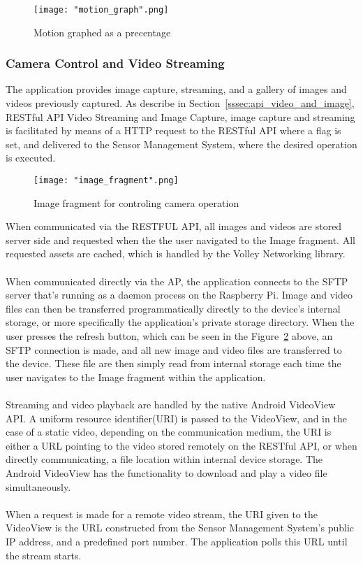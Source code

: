 \documentclass{article}
\begin{document}
\begin{figure}[H]
\centering
\texttt{[image: "motion\_graph".png]}
\caption{Motion graphed as a precentage}
\label{fig:android_summary_motion}
\end{figure}

\subsubsection{Camera Control and Video Streaming}
The application provides image capture, streaming, and a gallery of images and videos previously captured. As describe in Section~\ref{sssec:api_video_and_image}, RESTful API Video Streaming and Image Capture, image capture and streaming is facilitated by means of a HTTP request to the RESTful API where a flag is set, and delivered to the Sensor Management System, where the desired operation is executed.

\begin{figure}[H]
\centering
\texttt{[image: "image\_fragment".png]}
\caption{Image fragment for controling camera operation}
\label{fig:android_camera_fragment}
\end{figure}

\noindent
When communicated via the RESTFUL API, all images and videos are stored server side and requested when the the user navigated to the Image fragment. All requested assets are cached, which is handled by the Volley Networking library. \\\\
When communicated directly via the AP, the application connects to the SFTP server that's running as a daemon process on the Raspberry Pi. Image and video files can then be transferred programmatically directly to the device’s internal storage, or more specifically the application’s private storage directory. When the user presses the refresh button, which can be seen in the Figure~\ref{fig:android_camera_fragment} above, an SFTP connection is made, and all new image and video files are transferred to the device. These file are then simply read from internal storage each time the user navigates to the Image fragment within the application. \\\\
Streaming and video playback are handled by the native Android VideoView API. A uniform resource identifier(URI) is passed to the VideoView, and in the case of a static video, depending on the communication medium, the URI is either a URL pointing to the video stored remotely on the RESTful API, or when directly communicating, a file location within internal device storage. The Android VideoView has the functionality to download and play a video file simultaneously. \\\\
When a request is made for a remote video stream, the URI given to the VideoView is the URL constructed from the Sensor Management System\rq s public IP address, and a predefined port number. The application polls this URL until the stream starts. 
\end{document}
